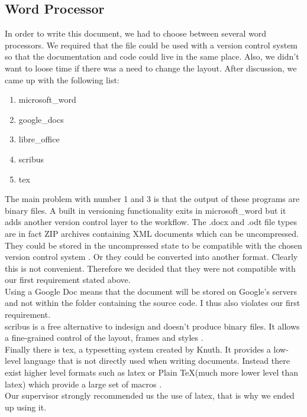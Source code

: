 \subsection{Word Processor}
In order to write this document, we had to choose between several word processors. We required that the file could be used with a version control system so that the documentation and code could live in the same place. Also, we didn't want to loose time if there was a need to change the layout. After discussion, we came up with the following list:
\begin{enumerate}
\item \Gls{microsoft_word}
\item \Gls{google_docs}
\item \Gls{libre_office}
\item \Gls{scribus}
\item \Gls{tex}
\end{enumerate}
The main problem with number 1 and 3 is that the output of these programs are binary files. A built in versioning functionality exits in \gls{microsoft_word} but it adds another version control layer to the workflow. The .docx and .odt file types are in fact ZIP archives containing XML documents which can be uncompressed. They could be stored in the uncompressed state to be compatible with the chosen version control system \cite{zipdocextension}. Or they could be converted into another format. Clearly this is not convenient. Therefore we decided that they were not compatible with our first requirement stated above.\\
Using a Google Doc means that the document will be stored on Google's servers and not within the folder containing the source code. I thus also violates our first requirement.\\
\Gls{scribus} is a free alternative to \gls{indesign} and doesn't produce binary files. It allows a fine-grained control of the layout, frames and styles \cite{ibm2013open}.\\
Finally there is \gls{tex}, a typesetting system created by Knuth. It provides a low-level language that is not directly used when writing documents. Instead there exist higher level formats such as \gls{latex} or Plain \TeX (much more lower level than \gls{latex}) which provide a large set of macros \cite{levels2017}.\\
Our supervisor strongly recommended us the use of \gls{latex}, that is why we ended up using it.